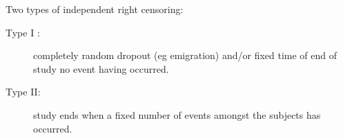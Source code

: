 \newpage
Two types of independent right censoring:
\begin{description}
\item[Type I :] completely random dropout (eg emigration) and/or fixed time of
end of study no event having occurred.
\item[Type II:] study ends when a fixed number of events amongst the subjects
has occurred.
\end{description}

